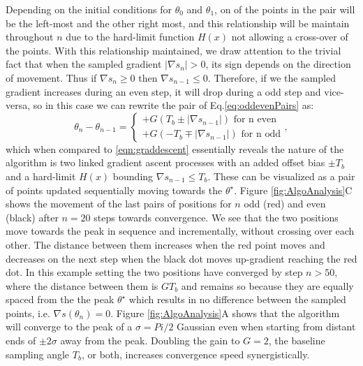 Depending on the initial conditions for $\theta_0$ and $\theta_1$, on of the points in the pair will be the left-most and the other right most, and this relationship will be maintain throughout $n$ due to the hard-limit function $H(x)$ not allowing a cross-over of the points. With this relationship maintained, we draw attention to the trivial fact that when the sampled gradient $|\nabla s_n| > 0$, its sign depends on the direction of movement. Thus if $\nabla s_n \geq 0$ then $\nabla s_{n-1} \leq 0$. Therefore, if we the sampled gradient  increases during an even step, it will drop during a odd step and vice-versa, so in this case we can rewrite the pair of Eq.\eqref{eq:oddevenPairs} as: 
\begin{equation}
\theta_n - \theta_{n-1} = 
\begin{cases}
+G (T_b \pm |\nabla s_{n-1}|) \mbox { for n even}\\
+G (-T_b \mp|\nabla s_{n-1}|) \mbox { for n odd}
\end{cases},
\label{eq:oddevenPairs2}
\end{equation}
which  when compared to \eqref{eqn:graddescent} essentially reveals the nature of the algorithm is two linked gradient ascent processes with an added offset bias $\pm T_b$ and a hard-limit $H(x)$ bounding $\nabla s_{n-1} \leq T_b$. These can be visualized as a pair of points updated sequentially moving towards the $\theta^\star$.  Figure \ref{fig:AlgoAnalysis}C shows the movement of the last pairs of positions for $n$ odd (red) and even (black) after $n=20$ steps towards convergence. We see that the two positions move towards the peak in sequence and incrementally, without crossing over each other. The distance between them increases when the red point moves and decreases on the next step when the black dot moves up-gradient reaching the red dot. In this example setting the two positions have converged by step $n>50$, where the distance between them is $G T_b$ and remains so because they are equally spaced from the the peak $\theta^\star$ which results in no difference between the sampled  points, i.e. $\nabla s(\theta_n) = 0$.
Figure \ref{fig:AlgoAnalysis}A shows that the algorithm will converge to the peak of a $\sigma=Pi/2$  Gaussian even when starting from distant ends of $\pm 2\sigma$ away from the peak. Doubling the gain to $G=2$, the baseline sampling angle $T_b$, or both, increases convergence speed synergistically.

